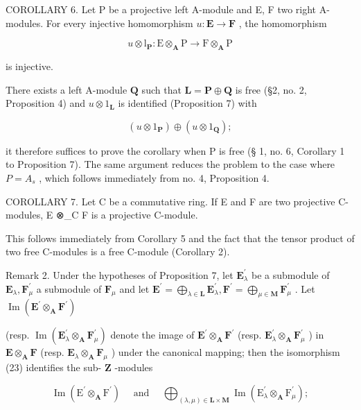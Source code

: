 COROLLARY 6. Let P be a projective left A-module and E, F two right A-modules. For every injective homomorphism \(u: \mathbf{E} \to \mathbf{F}\) , the homomorphism

\[
u \otimes \mathrm{l} _ {\mathbf {P}}: \mathrm{E} \otimes_ {\mathbf {A}} \mathrm{P} \rightarrow \mathrm{F} \otimes_ {\mathbf {A}} \mathrm{P}
\]

is injective.

There exists a left A-module \(\mathbf{Q}\) such that \(\mathbf{L} = \mathbf{P} \oplus \mathbf{Q}\) is free (§2, no. 2, Proposition 4) and \(u \otimes 1_{\mathbf{L}}\) is identified (Proposition 7) with

\[
(u \otimes 1 _ {\mathbf {P}}) \oplus (u \otimes 1 _ {\mathbf {Q}});
\]

it therefore suffices to prove the corollary when P is free (§ 1, no. 6, Corollary 1 to Proposition 7). The same argument reduces the problem to the case where \(P = A_{s}\) , which follows immediately from no. 4, Proposition 4.

COROLLARY 7. Let C be a commutative ring. If E and F are two projective C-modules, E ⊗\_C F is a projective C-module.

This follows immediately from Corollary 5 and the fact that the tensor product of two free C-modules is a free C-module (Corollary 2).

Remark 2. Under the hypotheses of Proposition 7, let \(\mathbf{E}_{\lambda}^{\prime}\) be a submodule of \(\mathbf{E}_{\lambda}, \mathbf{F}_{\mu}^{\prime}\) a submodule of \(\mathbf{F}_{\mu}\) and let \(\mathbf{E}^{\prime} = \bigoplus_{\lambda \in \mathbf{L}} \mathbf{E}_{\lambda}^{\prime}, \mathbf{F}^{\prime} = \bigoplus_{\mu \in \mathbf{M}} \mathbf{F}_{\mu}^{\prime}\) . Let \(\operatorname{Im}(\mathbf{E}^{\prime} \otimes_{\mathbf{A}} \mathbf{F}^{\prime})\)

(resp. \(\operatorname{Im}(\mathbf{E}_{\lambda}^{\prime}\otimes_{\mathbf{A}}\mathbf{F}_{\mu}^{\prime})\) denote the image of \(\mathbf{E}^{\prime}\otimes_{\mathbf{A}}\mathbf{F}^{\prime}\) (resp. \(\mathbf{E}_{\lambda}^{\prime}\otimes_{\mathbf{A}}\mathbf{F}_{\mu}^{\prime}\) ) in \(\mathbf{E}\otimes_{\mathbf{A}}\mathbf{F}\) (resp. \(\mathbf{E}_{\lambda}\otimes_{\mathbf{A}}\mathbf{F}_{\mu}\) ) under the canonical mapping; then the isomorphism (23) identifies the sub- \(\mathbf{Z}\) -modules

\[
\operatorname{Im} \left(\mathrm{E} ^ {\prime} \otimes_ {\mathbf {A}} \mathrm{F} ^ {\prime}\right) \quad \text { and } \quad \bigoplus_ {(\lambda , \mu) \in \mathbf {L} \times \mathbf {M}} \operatorname{Im} \left(\mathrm{E} _ {\lambda} ^ {\prime} \otimes_ {\mathbf {A}} \mathrm{F} _ {\mu} ^ {\prime}\right);
\]


